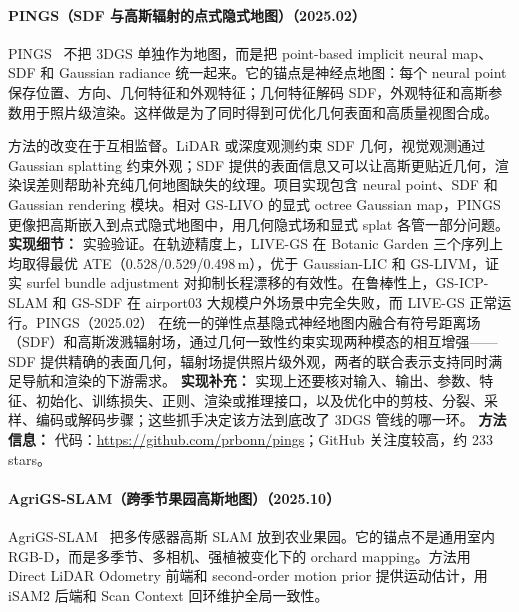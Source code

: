 \paragraph{PINGS（SDF 与高斯辐射的点式隐式地图）（2025.02）}
PINGS~\cite{2502_05752} 不把 3DGS 单独作为地图，而是把 point-based implicit neural map、SDF 和 Gaussian radiance 统一起来。它的锚点是神经点地图：每个 neural point 保存位置、方向、几何特征和外观特征；几何特征解码 SDF，外观特征和高斯参数用于照片级渲染。这样做是为了同时得到可优化几何表面和高质量视图合成。

方法的改变在于互相监督。LiDAR 或深度观测约束 SDF 几何，视觉观测通过 Gaussian splatting 约束外观；SDF 提供的表面信息又可以让高斯更贴近几何，渲染误差则帮助补充纯几何地图缺失的纹理。项目实现包含 neural point、SDF 和 Gaussian rendering 模块。相对 GS-LIVO 的显式 octree Gaussian map，PINGS 更像把高斯嵌入到点式隐式地图中，用几何隐式场和显式 splat 各管一部分问题。
\textbf{实现细节：} 实验验证。在轨迹精度上，LIVE-GS 在 Botanic Garden 三个序列上均取得最优 ATE（0.528/0.529/0.498\,m），优于 Gaussian-LIC 和 GS-LIVM，证实 surfel bundle adjustment 对抑制长程漂移的有效性。在鲁棒性上，GS-ICP-SLAM 和 GS-SDF 在 airport03 大规模户外场景中完全失败，而 LIVE-GS 正常运行。PINGS（2025.02） 在统一的弹性点基隐式神经地图内融合有符号距离场（SDF）和高斯泼溅辐射场，通过几何一致性约束实现两种模态的相互增强——SDF 提供精确的表面几何，辐射场提供照片级外观，两者的联合表示支持同时满足导航和渲染的下游需求。
\textbf{实现补充：} 实现上还要核对输入、输出、参数、特征、初始化、训练损失、正则、渲染或推理接口，以及优化中的剪枝、分裂、采样、编码或解码步骤；这些抓手决定该方法到底改了 3DGS 管线的哪一环。
\textbf{方法信息：} 代码：\url{https://github.com/prbonn/pings}；GitHub 关注度较高，约 233 stars。



\paragraph{AgriGS-SLAM（跨季节果园高斯地图）（2025.10）}
AgriGS-SLAM~\cite{2510_26358} 把多传感器高斯 SLAM 放到农业果园。它的锚点不是通用室内 RGB-D，而是多季节、多相机、强植被变化下的 orchard mapping。方法用 Direct LiDAR Odometry 前端和 second-order motion prior 提供运动估计，用 iSAM2 后端和 Scan Context 回环维护全局一致性。

